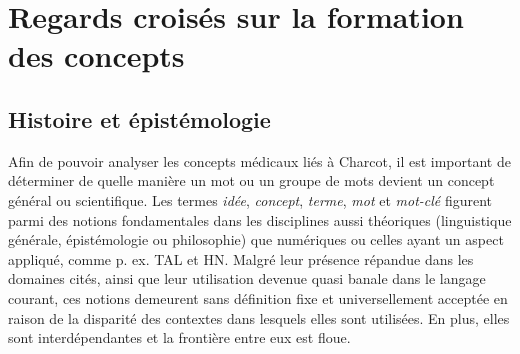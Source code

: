 \section{Regards croisés sur la formation des concepts}
\subsection{Histoire et épistémologie}
\label{concept}

Afin de pouvoir analyser les concepts médicaux liés à Charcot, il est important de déterminer de quelle manière un mot ou un groupe de mots devient un concept général ou scientifique. Les termes \textit{idée}, \textit{concept}, \textit{terme}, \textit{mot} et \textit{mot-clé} figurent parmi des notions fondamentales dans les disciplines aussi théoriques (linguistique générale, épistémologie ou philosophie) que numériques ou celles ayant un aspect appliqué, comme p. ex. \textsc{TAL} et \textsc{HN}. 
Malgré leur présence répandue dans les domaines cités, ainsi que leur utilisation devenue quasi banale dans le langage courant, ces notions demeurent sans définition fixe et universellement acceptée en raison de la disparité des contextes dans lesquels elles sont utilisées. En plus, elles sont interdépendantes et la frontière entre eux est floue. 

